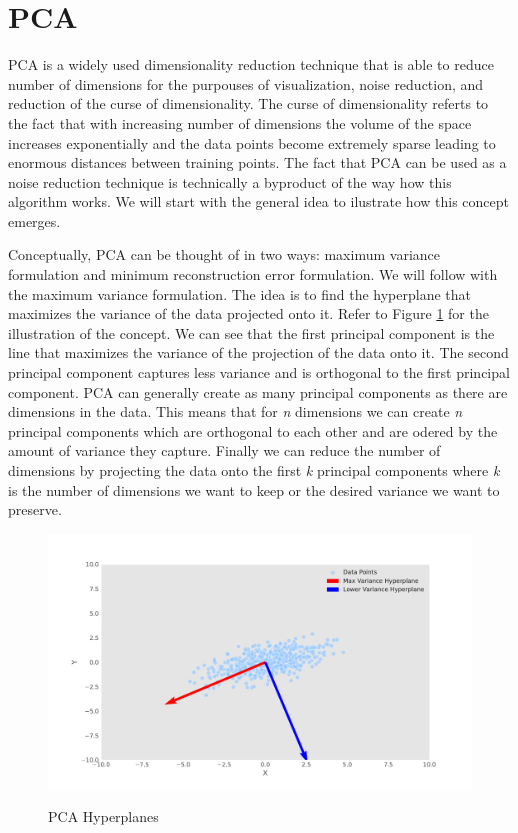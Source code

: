 \section{\acl{PCA}}

\ac{PCA} is a widely used dimensionality reduction technique that is able
to reduce number of dimensions for the purpouses of visualization, noise reduction, and
reduction of the curse of dimensionality. The curse of 
dimensionality referts to the fact that with increasing number of 
dimensions the volume of the space increases exponentially and the data points become
extremely sparse leading to enormous distances between training points.
The fact that \ac{PCA} can be used as a noise reduction technique is 
technically a byproduct of the way how this algorithm works. We will start with the
general idea to ilustrate how this concept emerges.


Conceptually, \ac{PCA} can be thought of in two ways: maximum variance formulation
and minimum reconstruction error formulation. We will follow with the maximum variance formulation.
The idea is to find the hyperplane that maximizes the variance of the data projected onto it.
Refer to Figure \ref{fig:pca} for the illustration of the concept. We can see
that the first principal component is the line that maximizes the variance of the projection
of the data onto it. The second principal component captures
less variance and is orthogonal to the first principal component. \ac{PCA} can
generally create as many principal components as there are dimensions in the data.
This means that for \textit{n} dimensions we can create \textit{n} principal components which
are orthogonal to each other and are odered by the amount of variance they capture. 
Finally we can reduce the number of dimensions by projecting the data onto the first \textit{k} principal components
where \textit{k} is the number of dimensions we want to keep or the desired variance 
we want to preserve.

\begin{figure}[!h]
    \centering
    \caption{\ac{PCA} Hyperplanes}
        \includegraphics[width=1\textwidth]{Figures/pca_plot.pdf}
    \label{fig:pca}
\end{figure}

